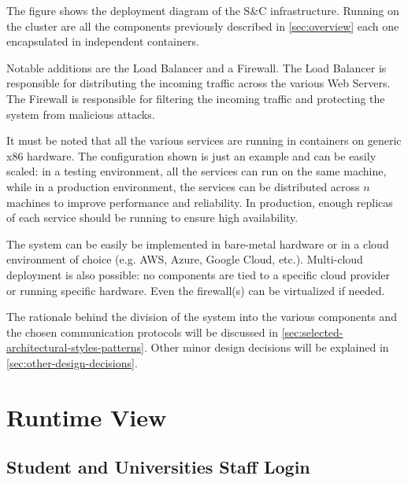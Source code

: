 \par The figure shows the deployment diagram of the S\&C infrastructure. Running on the cluster are all the components
previously described in \ref{sec:overview} each one encapsulated in independent containers.

\par Notable additions are the Load Balancer and a Firewall. The Load Balancer is responsible for distributing the
incoming traffic across the various Web Servers. The Firewall is responsible for filtering the incoming traffic and
protecting the system from malicious attacks.

\par It must be noted that all the various services are running in containers on generic x86 hardware.
The configuration shown is just an example and can be easily scaled: in a testing environment, all the services can run
on the same machine, while in a production environment, the services can be distributed across $n$ machines to improve
performance and reliability. In production, enough replicas of each service should be running to ensure high
availability.

\par The system can be easily be implemented in bare-metal hardware or in a cloud environment of choice (e.g. AWS, Azure,
Google Cloud, etc.). Multi-cloud deployment is also possible: no components are tied to a specific cloud provider or
running specific hardware. Even the firewall(s) can be virtualized if needed.

\par The rationale behind the division of the system into the various components and the chosen communication
protocols will be discussed in \ref{sec:selected-architectural-styles-patterns}. Other minor design decisions will be
explained in \ref{sec:other-design-decisions}.

\section{Runtime View}
\label{sec:runtime-view}%

\subsection{Student and Universities Staff Login}
\label{sub:student-and-universities-staff-login}%

